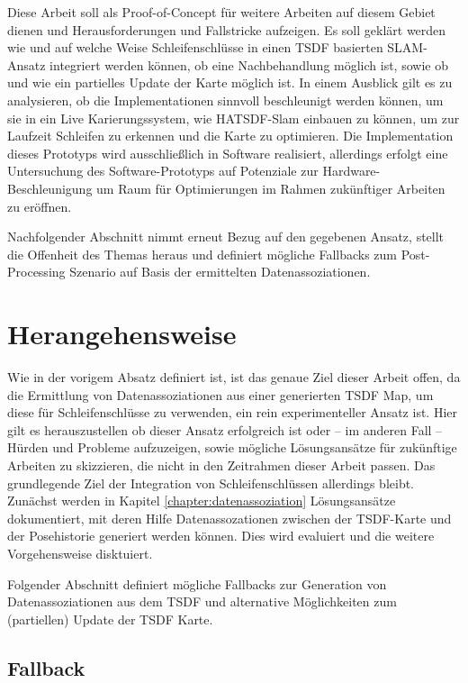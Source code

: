 Diese Arbeit soll als Proof-of-Concept für weitere Arbeiten auf diesem Gebiet dienen und Herausforderungen und Fallstricke aufzeigen. Es soll geklärt werden wie und auf welche Weise Schleifenschlüsse in einen TSDF basierten SLAM-Ansatz integriert werden können, ob eine Nachbehandlung möglich ist, sowie ob und wie ein partielles Update der Karte möglich ist.
In einem Ausblick gilt es zu analysieren, ob die Implementationen sinnvoll beschleunigt werden können, um sie in ein Live Karierungssystem, wie HATSDF-Slam einbauen zu können, um zur Laufzeit Schleifen zu erkennen und die Karte zu optimieren.
Die Implementation dieses Prototyps wird ausschließlich in Software realisiert, allerdings erfolgt eine Untersuchung des Software-Prototyps auf Potenziale zur Hardware-Beschleunigung um Raum für Optimierungen im Rahmen zukünftiger Arbeiten zu eröffnen.

Nachfolgender Abschnitt nimmt erneut Bezug auf den gegebenen Ansatz, stellt die Offenheit des Themas heraus und definiert mögliche Fallbacks zum Post-Processing Szenario auf Basis der ermittelten Datenassoziationen.

\section{Herangehensweise}
\label{section:herangehensweise}

Wie in der vorigem Absatz definiert ist, ist das genaue Ziel dieser Arbeit offen, da die Ermittlung von Datenassoziationen aus einer generierten TSDF Map, um diese für Schleifenschlüsse zu verwenden, ein rein experimenteller Ansatz ist.
Hier gilt es herauszustellen ob dieser Ansatz erfolgreich ist oder -- im anderen Fall -- Hürden und Probleme aufzuzeigen, sowie mögliche Lösungsansätze für zukünftige Arbeiten zu skizzieren, die nicht in den Zeitrahmen dieser Arbeit passen.
Das grundlegende Ziel der Integration von Schleifenschlüssen allerdings bleibt.
Zunächst werden in Kapitel \ref{chapter:datenassoziation} Lösungsansätze dokumentiert, mit deren Hilfe Datenassozationen zwischen der TSDF-Karte und der Posehistorie generiert werden können. Dies wird evaluiert und die weitere Vorgehensweise disktuiert.

Folgender Abschnitt definiert mögliche Fallbacks zur Generation von Datenassoziationen aus dem TSDF und alternative Möglichkeiten zum (partiellen) Update der TSDF Karte.

\subsection{Fallback}
\label{section:fallback}

